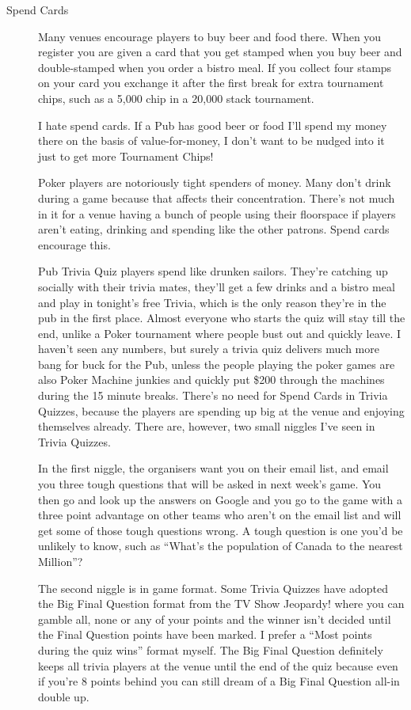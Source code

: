 \begin{description}

\item[Spend Cards] Many venues encourage players to buy beer and food
there. When you register you are given a card that you get stamped
when you buy beer and double-stamped when you order a bistro meal. If
you collect four stamps on your card you exchange it after the first
break for extra tournament chips, such as a 5,000 chip in a 20,000
stack tournament.

I hate spend cards. If a Pub has good beer or food I'll spend my money
there on the basis of value-for-money, I don't want to be nudged into
it just to get more Tournament Chips!

Poker players are notoriously tight spenders of money.
Many don't drink during a game because that affects their concentration.
There's not much in it for a venue having a bunch of people using
their floorspace if players aren't eating, drinking and spending like
the other patrons. Spend cards encourage this.

Pub Trivia Quiz players spend like drunken sailors. They're catching
up socially with their trivia mates, they'll get a few drinks and a
bistro meal and play in tonight's free Trivia, which is the only
reason they're in the pub in the first place. Almost everyone who
starts the quiz will stay till the end, unlike a Poker tournament
where people bust out and quickly leave. I haven't seen any numbers,
but surely a trivia quiz delivers much more bang for buck for the
Pub, unless the people playing the poker games are also Poker Machine
junkies and quickly put \$200 through the machines during the 15 minute
breaks. There's no need for Spend Cards in Trivia Quizzes, because the
players are spending up big at the venue and enjoying themselves already.
There are, however, two small niggles I've seen in Trivia Quizzes.

In the first niggle, the organisers want you on their email list, and
email you three tough questions that will be asked in next week's
game. You then go and look up the answers on Google and you go to the
game with a three point advantage on other teams who aren't on the
email list and will get some of those tough questions wrong. A tough
question is one you'd be unlikely to know, such as ``What's the
population of Canada to the nearest Million''?

The second niggle is in game format. Some Trivia Quizzes have adopted
the Big Final Question format from the TV Show Jeopardy! where you can
gamble all, none or any of your points and the winner isn't decided
until the Final Question points have been marked. I prefer a ``Most
points during the quiz wins'' format myself. The Big Final Question
definitely keeps all trivia players at the venue until the end of the
quiz because even if you're 8 points behind you can still dream of a
Big Final Question all-in double up.


\end{description}
